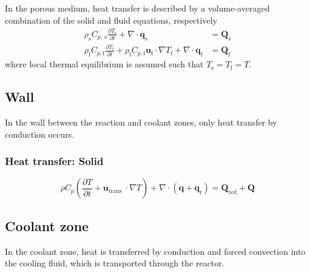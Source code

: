In the porous medium, heat transfer is described by a volume-averaged combination of the solid and fluid equations, respectively \cite{comsol_heat_2020}
\begin{align}
    \rho_{\mathrm{s}} C_{p, \mathrm{~s}} \frac{\partial T_{\mathrm{s}}}{\partial t}+\nabla \cdot \mathbf{q}_{\mathrm{s}} &= \mathbf{Q}_{\mathrm{s}} \\
    \rho_{\mathrm{f}} C_{p, \mathrm{f}} \frac{\partial T_{\mathrm{f}}}{\partial t}+\rho_{\mathrm{f}} C_{p, \mathrm{f}} \mathbf{u}_{\mathrm{f}} \cdot \nabla T_{\mathrm{f}}+\nabla \cdot \mathbf{q}_{\mathrm{f}} &= \mathbf{Q}_{\mathrm{f}}
\end{align}
where local thermal equilibrium is assumed such that $T_{\mathrm{s}} = T_{\mathrm{f}} = T$.

\subsection{Wall}

In the wall between the reaction and coolant zones, only heat transfer by conduction occurs.

\subsubsection{Heat transfer: Solid}
\cite{comsol_heat_2020}
\begin{equation}
    \rho C_{p}\left(\frac{\partial T}{\partial t}+\mathbf{u}_{\text {trans }} \cdot \nabla T\right)+\nabla \cdot\left(\mathbf{q}+\mathbf{q}_{\mathrm{r}}\right)= \mathbf{Q}_{\mathrm{ted}}+ \mathbf{Q}
\end{equation}

\subsection{Coolant zone}

In the coolant zone, heat is transferred by conduction and forced convection into the cooling fluid, which is transported through the reactor.

